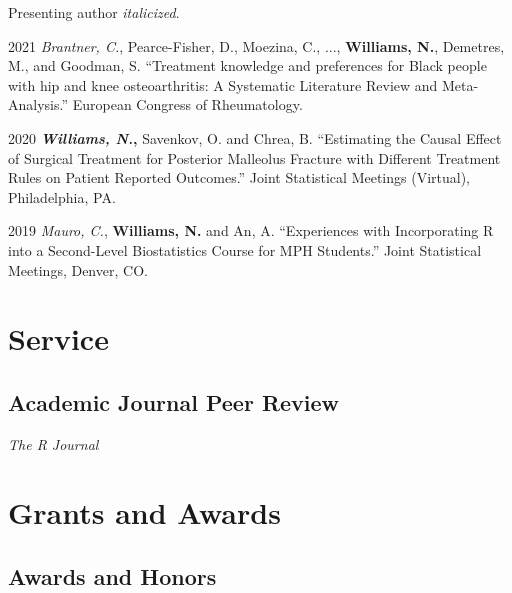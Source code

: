 \documentclass[12pt,letterpaper]{report}
\newcommand{\listitemspace}{0.15em}
\renewenvironment{itemize}
{\begin{list}{}{\setlength{\leftmargin}{0em}
            \setlength{\parskip}{0em}
            \setlength{\itemsep}{\listitemspace}
            \setlength{\parsep}{\listitemspace}}}
    {\end{list}}
\begin{document}
    Presenting author \textit{italicized}. \bigskip

    \begin{tablist}
    
    \item[2021] \tab \textit{Brantner, C.}, Pearce-Fisher, D., Moezina, C., ..., \textbf{Williams, N.}, Demetres, M., and Goodman, S. \enquote{Treatment knowledge and preferences for Black people with hip and knee osteoarthritis: A Systematic Literature Review and Meta-Analysis.} European Congress of Rheumatology.
    
	\item[2020] \tab \textbf{\textit{Williams, N.},} Savenkov, O. and Chrea, B. \enquote{Estimating the Causal Effect of Surgical Treatment for Posterior Malleolus Fracture with Different Treatment Rules on Patient Reported Outcomes.} Joint Statistical Meetings (Virtual), Philadelphia, PA.
    
    	\item[2019] \tab \textit{Mauro, C.}, \textbf{Williams, N.} and An, A. \enquote{Experiences with Incorporating R into a Second-Level Biostatistics Course for MPH Students.} Joint Statistical Meetings, Denver, CO.

    \end{tablist}
    
    \section*{Service}
    
    \subsection*{Academic Journal Peer Review}
    
    \begin{itemize}
    
    	\item \textit{The R Journal}
    
    \end{itemize}

    \section*{Grants and Awards}

    \subsection*{Awards and Honors}
\end{document}
